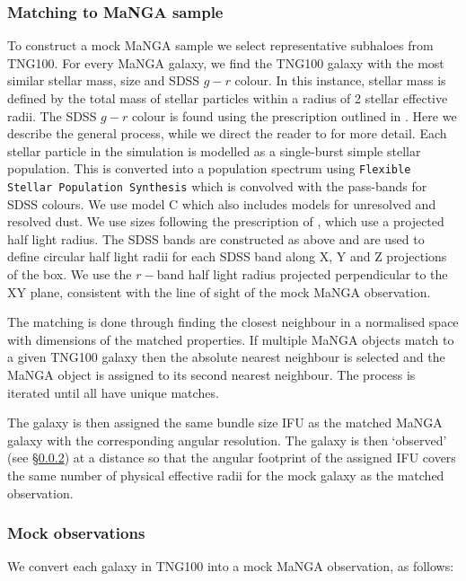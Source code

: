 \subsubsection{Matching to MaNGA sample}
To construct a mock MaNGA sample we select representative subhaloes from TNG100. For every MaNGA galaxy, we find the TNG100 galaxy with the most similar stellar mass, size and SDSS $g - r$ colour. In this instance, stellar mass is defined by the total mass of stellar particles within a radius of 2 stellar effective radii. The SDSS $g - r$ colour is found using the prescription outlined in \citet{nelson18}. Here we describe the general process, while we direct the reader to \citet{nelson18} for more detail. Each stellar particle in the simulation is modelled as a single-burst simple stellar population. This is converted into a population spectrum using \texttt{Flexible Stellar Population Synthesis} \citep{conroy2009,conroy2010,foreman_mackey2014} which is convolved with the pass-bands for SDSS colours. We use model C \citep[as described in][]{nelson18} which also includes models for unresolved and resolved dust. We use sizes following the prescription of \citet{genel2018}, which use a projected half light radius. The SDSS bands are constructed as above and are used to define circular half light radii for each SDSS band along X, Y and Z projections of the box. We use the $r-$band half light radius projected perpendicular to the XY plane, consistent with the line of sight of the mock MaNGA observation.

The matching is done through finding the closest neighbour in a normalised space with dimensions of the matched properties. If multiple MaNGA objects match to a given TNG100 galaxy then the absolute nearest neighbour is selected and the MaNGA object is assigned to its second nearest neighbour. The process is iterated until all have unique matches. 

The galaxy is then assigned the same bundle size IFU as the matched MaNGA galaxy with the corresponding angular resolution. The galaxy is then `observed' (see \S\ref{sec:mock_obs}) at a distance so that the angular footprint of the assigned IFU covers the same number of physical effective radii for the mock galaxy as the matched observation. 

\subsubsection{Mock observations} \label{sec:mock_obs}
We convert each galaxy in TNG100 into a mock MaNGA observation, as follows:

